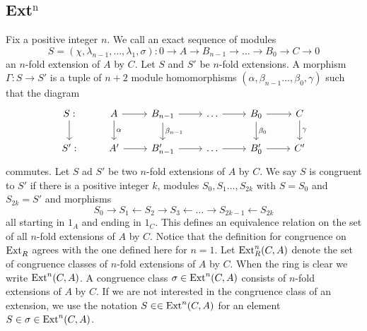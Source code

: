 \subsection{Ext$^\text{n}$} 
Fix a positive integer $n$.
We call an exact sequence of modules
\begin{equation}
\label{nfoldextension}
S = (\chi, \lambda_{n-1}, \dots, \lambda_1, \sigma) : 0 \rightarrow A \rightarrow B_{n-1} \rightarrow \dots  \rightarrow B_0 \rightarrow C \rightarrow 0
\end{equation}
an $n$-fold extension of $A$ by $C$.
Let $S$ and $S'$ be $n$-fold extensions.
A morphism $\Gamma:S\rightarrow S'$ is a tuple of $n+2$ module homomorphisms $(\alpha,\beta_{n-1}...,\beta_{0},\gamma)$ such that the diagram
\[\begin{tikzcd}
S: \arrow{d} & 
A \arrow{r} \arrow{d}{\alpha} &
B_{n-1} \arrow{r}\arrow{d}{\beta_{n-1}} & 
\dots \arrow{r} & 
B_0 \arrow{r} \arrow{d}{\beta_0}& 
C %
\arrow{d}{\gamma} 
\\
S': & 
A' \arrow{r} & 
B_{n-1}' \arrow{r} & 
\dots \arrow{r} &
B_0' \arrow{r} & 
C' %
\end{tikzcd}\]
commutes.
Let $S$ ad $S'$ be two $n$-fold extensions of $A$ by $C$.
We say $S$ is congruent to $S'$ if there is a positive integer $k$, modules $S_0,S_1 \dots,S_{2k}$ with $S=S_0$ and $S_{2k}=S'$ and morphisms
\begin{equation*}
S_0 \to S_1 \leftarrow S_2 \to S_3 \leftarrow \dots \to S_{2k-1} \leftarrow S_{2k}
\end{equation*}
all starting in $1_A$ and ending in $1_C$.
This defines an equivalence relation on the set of all $n$-fold extensions of $A$ by $C$.
Notice that the definition for congruence on $\operatorname{Ext}^{}_{R}$ agrees with the one defined here for $n=1$.
Let $\operatorname{Ext}^{n}_{R}(C,A)$ denote the set of congruence classes of $n$-fold extensions of $A$ by $C$.
When the ring is clear we write $\operatorname{Ext}^{n}(C,A)$.
A congruence class $\sigma\in\operatorname{Ext}^{n}(C,A)$ consists of $n$-fold extensions of $A$ by $C$.
If we are not interested in the congruence class of an extension, we use the notation $S \in\in \operatorname{Ext}^{n}(C,A)$ for an element $S\in\sigma\in \operatorname{Ext}^{n}(C,A)$.
